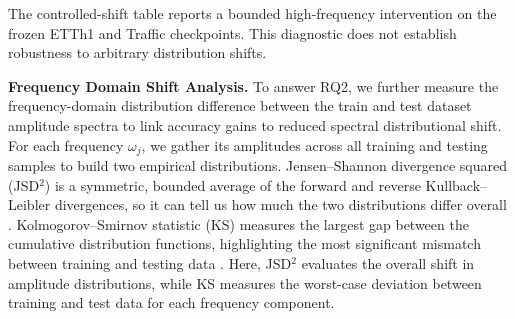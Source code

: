 \documentclass[sigconf,anonymous,review]{acmart}
\newcommand{\resubmitchange}[1]{#1}
\begin{document}
\begin{table}[H]
\centering
\caption{Mechanism diagnostics over three seeds. The gain ratio compares the
highest- and lowest-score quartiles. Permuted preserves the score distribution
but breaks its frequency correspondence; Ones removes score variation.}
\label{table:mechanism_diagnostics}
\small
{}
\end{table}

\resubmitchange{The controlled-shift table reports a bounded high-frequency intervention on the frozen ETTh1 and Traffic checkpoints. This diagnostic does not establish robustness to arbitrary distribution shifts.}





\noindent\textbf{Frequency Domain Shift Analysis.}
To answer RQ2, we further measure the frequency-domain distribution difference between the train and test dataset amplitude spectra to link accuracy gains to reduced spectral distributional shift.
For each frequency $\omega_j$, we gather its amplitudes across all training and testing samples to build two empirical distributions.
Jensen–Shannon divergence squared (JSD$^2$) is a symmetric, bounded average of the forward and reverse Kullback–Leibler divergences, so it can tell us how much the two distributions differ overall \citep{Detecting_JSD,iqbal2021enhancing_JS}.
Kolmogorov–Smirnov statistic (KS) measures the largest gap between the cumulative distribution functions, highlighting the most significant mismatch between training and testing data \citep{wang2010KS_test}.
Here, JSD$^2$ evaluates the overall shift in amplitude distributions, while KS measures the worst-case deviation between training and test data for each frequency component.
\end{document}
